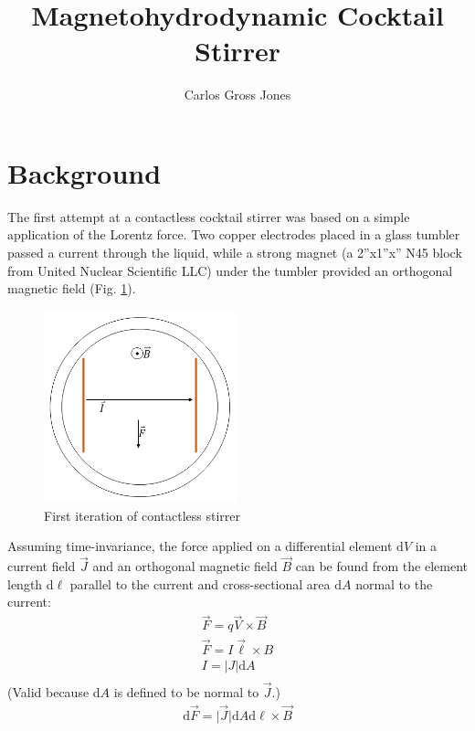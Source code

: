 \documentclass[]{article}
\title{Magnetohydrodynamic Cocktail Stirrer}
\author{Carlos Gross Jones}
\begin{document}
\maketitle

\begin{abstract}

\end{abstract}
\newpage
\section{Background}
\par The first attempt at a contactless cocktail stirrer was based on a simple application of the Lorentz force. Two copper electrodes placed in a glass tumbler passed a current through the liquid, while a strong magnet (a 2''x1''x'' N45 block from United Nuclear Scientific LLC) under the tumbler provided an orthogonal magnetic field (Fig. \ref{fig:oldversion}). 
\begin{figure}
	\centering
	\includegraphics[width=0.5\textwidth]{Oldversion}
	\caption{First iteration of contactless stirrer}
	\label{fig:oldversion}
\end{figure}
Assuming time-invariance, the force applied on a differential element $\mathrm{d}V$ in a current field $\vec{J}$ and an orthogonal magnetic field $\vec{B}$ can be found from the element length d$\ell$ parallel to the current and cross-sectional area d$A$ normal to the current:
\begin{align}
\vec{F}=q\vec{V}\times\vec{B}\\
\vec{F}=I\vec{\ell}\times B\\
I=\lvert J\rvert\mathrm{d}A\\
\end{align}
(Valid because d$A$ is defined to be normal to $\vec{J}$.)
\begin{align}
\mathrm{d}\vec{F}=\lvert\vec{J}\rvert\mathrm{d}A\mathrm{d}\ell\times\vec{B}
\end{align}
\end{document}
